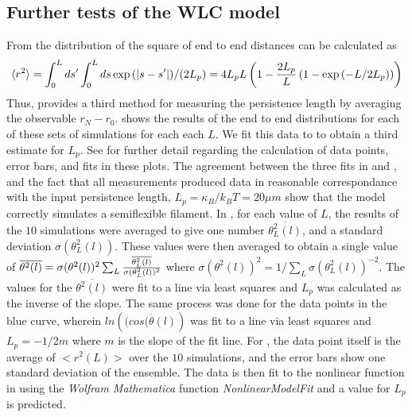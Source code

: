 \documentclass[12pt]{article}
\begin{document}
\subsection{ Further tests of the WLC model }\label{lpCalc}
From  the distribution of the square of end to end distances can be calculated as 
\begin{equation}
  \langle r^2\rangle=\int_0^L{ds'}\int_0^L{ds \exp{(|s-s'|)/(2L_p)}}=4L_p L\left( 1-{2L_p\over L}\left( 1-\exp{(-L/2L_p)} \right) \right)
  \label{eqn:r2}
\end{equation} 
Thus,  provides a third method for measuring the persistence length by
averaging the observable $r_N-r_0$.
 shows the results of the end to end distributions for each of these sets of simulations for each each $L$.  
We fit this data to  to obtain a third estimate for $L_p$. 
See  for further detail regarding the calculation of data points, error bars, and fits in these plots.  
The agreement between the three fits in  and , and the
fact that all measurements produced data in reasonable correspondance with the input persistence length, $L_p =
\kappa_B/k_BT = 20\mu m$ show that the model correctly simulates a semiflexible filament. 
In , for each value of $L$, the results of the $10$ simulations were averaged to 
give one number $\overline{\theta^2_L(l)}$, and a standard deviation $\sigma(\theta^2_L(l))$. These values were then averaged 
to obtain a single value of $\overline{\theta^2(l)} = \sigma(\theta^2(l))^2\sum_L{\overline{\theta^2_L(l)}\over\sigma(\theta^2_L(l))^2}$ where
$\sigma(\theta^2(l))^2 = 1/\sum_L{\sigma(\theta^2_L(l))^{-2}}$. The values for the $\overline{\theta^2(l)}$ were fit to
a line via least squares and $L_p$ was calculated as the inverse of the slope. The same process was done for the data points in the
blue curve, wherein $ln(\overline{(cos(\theta(l)})$ was fit to a line via least squares and $L_p = -1/2m$ where $m$ is the
slope of the fit line. For , the data point itself is the average of $<r^2(L)>$ over the $10$ simulations, 
and the error bars show one standard deviation of
the ensemble. The data is then fit to the nonlinear function in  using the \textit{Wolfram Mathematica} function  
\textit{NonlinearModelFit} and a value for $L_p$ is predicted. 
\end{document}
